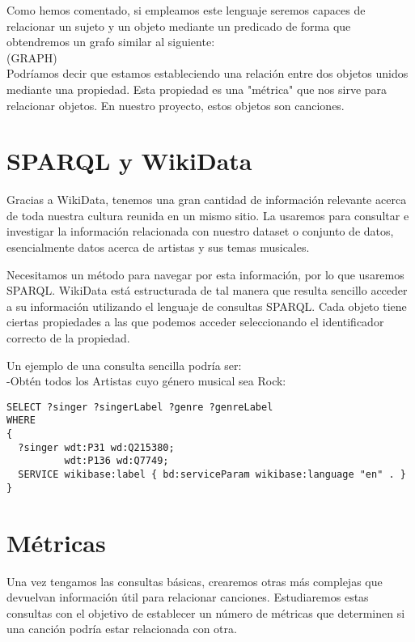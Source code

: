 Como hemos comentado, si empleamos este lenguaje seremos capaces de relacionar un sujeto y un objeto mediante un predicado de forma que obtendremos un grafo similar al siguiente:\\

(GRAPH)\\

Podríamos decir que estamos estableciendo una relación entre dos objetos unidos mediante una propiedad. Esta propiedad es una "métrica" que nos sirve para relacionar objetos. En nuestro proyecto, estos objetos son canciones.


\section{SPARQL y WikiData}

Gracias a WikiData, tenemos una gran cantidad de información relevante acerca de toda nuestra cultura reunida en un mismo sitio. La usaremos para consultar e investigar la información relacionada con nuestro dataset o conjunto de datos, esencialmente datos acerca de artistas y sus temas musicales.

Necesitamos un método para navegar por esta información, por lo que usaremos SPARQL. WikiData está estructurada de tal manera que resulta sencillo acceder a su información utilizando el lenguaje de consultas SPARQL. Cada objeto tiene ciertas propiedades a las que podemos acceder seleccionando el identificador correcto de la propiedad.

Un ejemplo de una consulta sencilla podría ser:\\

-Obtén todos los Artistas cuyo género musical sea Rock:\\

\begin{lstlisting}[language=SPARQL]
SELECT ?singer ?singerLabel ?genre ?genreLabel
WHERE
{
  ?singer wdt:P31 wd:Q215380;
      	  wdt:P136 wd:Q7749;
  SERVICE wikibase:label { bd:serviceParam wikibase:language "en" . }
}
\end{lstlisting}


\section{Métricas}

Una vez tengamos las consultas básicas, crearemos otras más complejas que devuelvan información útil para relacionar canciones. Estudiaremos estas consultas con el objetivo de establecer un número de métricas que determinen si una canción podría estar relacionada con otra.

